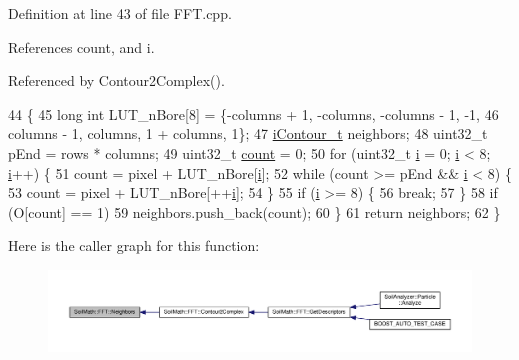 Definition at line 43 of file F\+F\+T.\+cpp.



References count, and i.



Referenced by Contour2\+Complex().


\begin{DoxyCode}
44                                          \{
45   \textcolor{keywordtype}{long} \textcolor{keywordtype}{int} LUT\_nBore[8] = \{-columns + 1, -columns, -columns - 1, -1,
46                            columns - 1,  columns,  1 + columns,  1\};
47   \hyperlink{_soil_math_types_8h_a1ade796add2f13888dfa9e6bde0bdc37}{iContour\_t} neighbors;
48   uint32\_t pEnd = rows * columns;
49   uint32\_t \hyperlink{_comparision_pictures_2_createtest_image_8m_ae11b3deb3de3df7dc48e439074023e35}{count} = 0;
50   \textcolor{keywordflow}{for} (uint32\_t \hyperlink{_comparision_pictures_2_createtest_image_8m_a6f6ccfcf58b31cb6412107d9d5281426}{i} = 0; \hyperlink{_comparision_pictures_2_createtest_image_8m_a6f6ccfcf58b31cb6412107d9d5281426}{i} < 8; \hyperlink{_comparision_pictures_2_createtest_image_8m_a6f6ccfcf58b31cb6412107d9d5281426}{i}++) \{
51     count = pixel + LUT\_nBore[\hyperlink{_comparision_pictures_2_createtest_image_8m_a6f6ccfcf58b31cb6412107d9d5281426}{i}];
52     \textcolor{keywordflow}{while} (count >= pEnd && \hyperlink{_comparision_pictures_2_createtest_image_8m_a6f6ccfcf58b31cb6412107d9d5281426}{i} < 8) \{
53       count = pixel + LUT\_nBore[++\hyperlink{_comparision_pictures_2_createtest_image_8m_a6f6ccfcf58b31cb6412107d9d5281426}{i}];
54     \}
55     \textcolor{keywordflow}{if} (\hyperlink{_comparision_pictures_2_createtest_image_8m_a6f6ccfcf58b31cb6412107d9d5281426}{i} >= 8) \{
56       \textcolor{keywordflow}{break};
57     \}
58     \textcolor{keywordflow}{if} (O[count] == 1)
59       neighbors.push\_back(count);
60   \}
61   \textcolor{keywordflow}{return} neighbors;
62 \}
\end{DoxyCode}


Here is the caller graph for this function\+:\nopagebreak
\begin{figure}[H]
\begin{center}
\leavevmode
\includegraphics[width=350pt]{class_soil_math_1_1_f_f_t_a45b32ad009154112d2fc4e467fc7c5ac_icgraph}
\end{center}
\end{figure}




